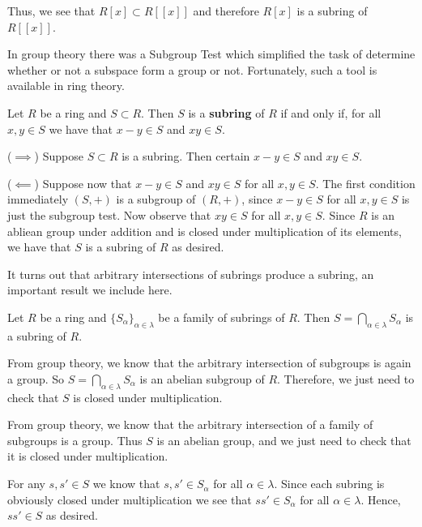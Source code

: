 \documentclass[12pt,letterpaper]{algebra_book}
\theoremstyle{definition}
\begin{document}
    Thus, we see that $R[x] \subset R[[x]]$ and therefore $R[x]$
    is a subring of $R[[x]]$.

    In group theory there was a Subgroup Test which simplified the
    task of determine whether or not a subspace form a group or
    not. Fortunately, such a tool is available in ring theory.

    \begin{thm}
        Let $R$ be a ring and $S \subset R$. Then $S$ is a
        \textbf{subring} of $R$ if and only if, for all $x, y \in
        S$ we have that $x - y \in S$ and $xy \in S$.
    \end{thm}

    \begin{prf}
        ($\implies$) Suppose $S \subset R$ is a subring. Then
        certain $x - y \in S$ and $xy \in S$. 

        ($\impliedby$) Suppose now that $x - y \in S$ and $xy \in
        S$ for all $x, y \in S$. The first condition immediately
        $(S, +)$ is a subgroup of $(R, +)$, since $x - y \in S$
        for all $x, y \in S$ is just the subgroup test. Now observe that $xy \in S$ for all $x, y \in S$.
        Since $R$ is an abliean group under addition and is closed
        under multiplication of its elements, we have that $S$ is
        a subring of $R$ as desired.
    \end{prf}

    It turns out that arbitrary intersections of subrings produce
    a subring, an important result we include here. 

    \begin{thm}\label{subring_intersections}
        Let $R$ be a ring and $\{S_\alpha\}_{\alpha \in \lambda}$
        be a family of subrings of $R$. Then $S = \bigcap_{\alpha
        \in \lambda} S_\alpha$ is a subring of $R$. 
    \end{thm}

    \begin{prf}
        From group theory, we know that the arbitrary intersection
        of subgroups is again a group. So $S = \bigcap_{\alpha \in
        \lambda} S_\alpha$ is an abelian subgroup of $R$. 
        Therefore, we just need to
        check that $S$ is
        closed under multiplication. 

        From group theory, we know that the arbitrary
        intersection of a family of subgroups is a group. Thus $S$
        is an abelian group, and we just need to check that it is
        closed under multiplication. 

        For any $s, s' \in S$ we know that $s, s' \in S_\alpha$
        for all $\alpha \in \lambda$. Since each subring is
        obviously closed under multiplication we see that $ss' \in
        S_\alpha$ for all $\alpha \in \lambda$. Hence, $ss' \in S$
        as desired.
    \end{prf}
\end{document}
